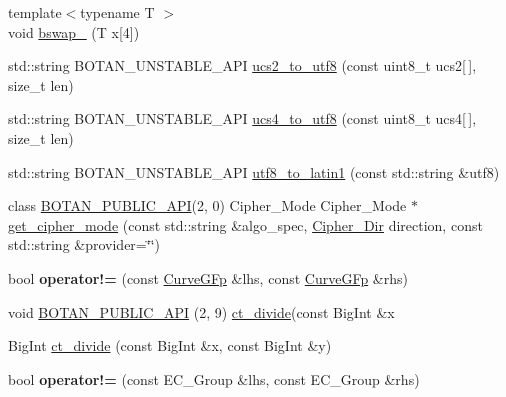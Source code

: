 \begin{DoxyCompactItemize}
\item 
{\footnotesize template$<$typename T $>$ }\\void \hyperlink{namespace_botan_a5ec087b9959d7ffcbc195dcedbf10513}{bswap\+\_} (T x\mbox{[}4\mbox{]})
\item 
std\+::string B\+O\+T\+A\+N\+\_\+\+U\+N\+S\+T\+A\+B\+L\+E\+\_\+\+A\+PI \hyperlink{namespace_botan_a2d7ee67f502279fc24a01b42c5451c3c}{ucs2\+\_\+to\+\_\+utf8} (const uint8\+\_\+t ucs2\mbox{[}$\,$\mbox{]}, size\+\_\+t len)
\item 
std\+::string B\+O\+T\+A\+N\+\_\+\+U\+N\+S\+T\+A\+B\+L\+E\+\_\+\+A\+PI \hyperlink{namespace_botan_a2bb4359def9a750e534e6ece252bd319}{ucs4\+\_\+to\+\_\+utf8} (const uint8\+\_\+t ucs4\mbox{[}$\,$\mbox{]}, size\+\_\+t len)
\item 
std\+::string B\+O\+T\+A\+N\+\_\+\+U\+N\+S\+T\+A\+B\+L\+E\+\_\+\+A\+PI \hyperlink{namespace_botan_a590c935190a5568639820d98a911f7cd}{utf8\+\_\+to\+\_\+latin1} (const std\+::string \&utf8)
\item 
class \hyperlink{namespace_botan_a6b9388030d872e586a4655b776ac9501}{B\+O\+T\+A\+N\+\_\+\+P\+U\+B\+L\+I\+C\+\_\+\+A\+PI}(2, 0) Cipher\+\_\+\+Mode Cipher\+\_\+\+Mode $\ast$ \hyperlink{namespace_botan_a9074784e382345388cdeb6db3e69c823}{get\+\_\+cipher\+\_\+mode} (const std\+::string \&algo\+\_\+spec, \hyperlink{namespace_botan_a8d9547a8fb3e868810b169b20ac389ee}{Cipher\+\_\+\+Dir} direction, const std\+::string \&provider=\char`\"{}\char`\"{})
\item 
\mbox{\label{namespace_botan_a0dd2cd53144b9dd0eafcf6f8d0c5d3a1}} 
bool {\bfseries operator!=} (const \hyperlink{class_botan_1_1_curve_g_fp}{Curve\+G\+Fp} \&lhs, const \hyperlink{class_botan_1_1_curve_g_fp}{Curve\+G\+Fp} \&rhs)
\item 
void \hyperlink{namespace_botan_aa3f182a6e03c7c9fe8dc72155f4c7432}{B\+O\+T\+A\+N\+\_\+\+P\+U\+B\+L\+I\+C\+\_\+\+A\+PI} (2, 9) \hyperlink{namespace_botan_a3dae86365040de11eff244d355b1fe04}{ct\+\_\+divide}(const Big\+Int \&x
\item 
Big\+Int \hyperlink{namespace_botan_a3dae86365040de11eff244d355b1fe04}{ct\+\_\+divide} (const Big\+Int \&x, const Big\+Int \&y)
\item 
\mbox{\label{namespace_botan_a4d0a0af0ddf73a8188e0773592b994db}} 
bool {\bfseries operator!=} (const E\+C\+\_\+\+Group \&lhs, const E\+C\+\_\+\+Group \&rhs)
\item 
\mbox{\label{namespace_botan_a9ff752f8dbf6614ace0d74e981ab2d80}} 

\end{DoxyCompactItemize}
